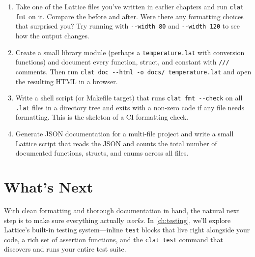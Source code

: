 \begin{enumerate}
  \item Take one of the Lattice files you've written in earlier chapters and run \lstinline|clat fmt| on it. Compare the before and after. Were there any formatting choices that surprised you? Try running with \lstinline|--width 80| and \lstinline|--width 120| to see how the output changes.

  \item Create a small library module (perhaps a \lstinline|temperature.lat| with conversion functions) and document every function, struct, and constant with \lstinline|///| comments. Then run \lstinline|clat doc --html -o docs/ temperature.lat| and open the resulting HTML in a browser.

  \item Write a shell script (or Makefile target) that runs \lstinline|clat fmt --check| on all \lstinline|.lat| files in a directory tree and exits with a non-zero code if any file needs formatting. This is the skeleton of a CI formatting check.

  \item Generate JSON documentation for a multi-file project and write a small Lattice script that reads the JSON and counts the total number of documented functions, structs, and enums across all files.
\end{enumerate}

\section*{What's Next}\label{sec:formatter-docgen-next}

With clean formatting and thorough documentation in hand, the natural next step is to make sure everything actually \emph{works}.
In \cref{ch:testing}, we'll explore Lattice's built-in testing system---inline \lstinline|test| blocks that live right alongside your code, a rich set of assertion functions, and the \lstinline|clat test| command that discovers and runs your entire test suite.
